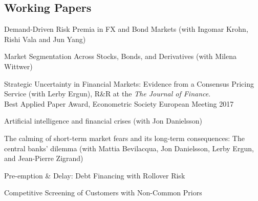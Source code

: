 \documentclass[margin,line, 11pt]{res}
\newenvironment{list1}{
  \begin{list}{\ding{113}}{%
      \setlength{\itemsep}{0in}
      \setlength{\parsep}{0in} \setlength{\parskip}{0in}
      \setlength{\topsep}{0in} \setlength{\partopsep}{0in} 
      \setlength{\leftmargin}{0.17in}}}{\end{list}}
\begin{document}
\begin{resume}
\section{\sc Working Papers}
\begin{list1}
\item[] Demand-Driven Risk Premia in FX and Bond Markets (with Ingomar Krohn, Rishi Vala and Jun Yang)
\item[] Market Segmentation Across Stocks, Bonds, and Derivatives (with Milena Wittwer)
\item[] Strategic Uncertainty in Financial Markets: Evidence from a Consensus Pricing Service (with Lerby Ergun), R\&R at the \textit{The Journal of Finance}.\\
Best Applied Paper Award, Econometric Society European Meeting 2017
\vspace*{0.2cm}
\item[] Artificial intelligence and financial crises (with Jon Danielsson)
\vspace*{0.2cm}
\item[] The calming of short-term market fears and its long-term consequences: The central banks' dilemma (with Mattia Bevilacqua, Jon Danielsson, Lerby Ergun,  and Jean-Pierre Zigrand)
\vspace*{0.2cm}
\item[] Pre-emption \& Delay: Debt Financing with Rollover Risk
\vspace*{0.2cm}
\item[] Competitive Screening of Customers with Non-Common Priors
\end{list1}



\end{resume}
\end{document}
